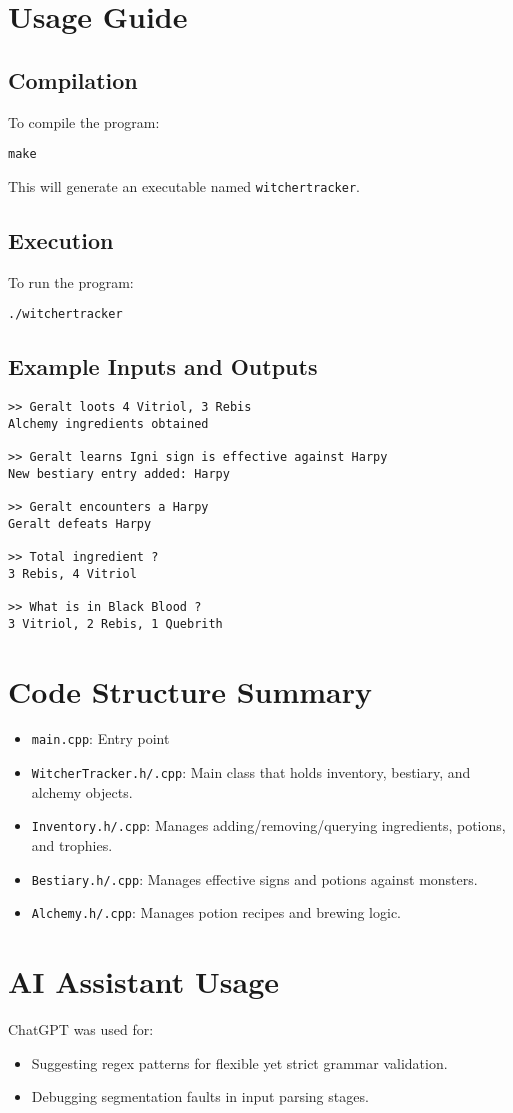\documentclass[12pt]{article}
\begin{document}
\section{Usage Guide}

\subsection{Compilation}
To compile the program:
\begin{verbatim}
make
\end{verbatim}

This will generate an executable named \texttt{witchertracker}.

\subsection{Execution}
To run the program:
\begin{verbatim}
./witchertracker
\end{verbatim}

\subsection{Example Inputs and Outputs}
\begin{verbatim}
>> Geralt loots 4 Vitriol, 3 Rebis
Alchemy ingredients obtained

>> Geralt learns Igni sign is effective against Harpy
New bestiary entry added: Harpy

>> Geralt encounters a Harpy
Geralt defeats Harpy

>> Total ingredient ?
3 Rebis, 4 Vitriol

>> What is in Black Blood ?
3 Vitriol, 2 Rebis, 1 Quebrith
\end{verbatim}

\section{Code Structure Summary}

\begin{itemize}
    \item \texttt{main.cpp}: Entry point
    \item \texttt{WitcherTracker.h/.cpp}: Main class that holds inventory, bestiary, and alchemy objects.
    \item \texttt{Inventory.h/.cpp}: Manages adding/removing/querying ingredients, potions, and trophies.
    \item \texttt{Bestiary.h/.cpp}: Manages effective signs and potions against monsters.
    \item \texttt{Alchemy.h/.cpp}: Manages potion recipes and brewing logic.
\end{itemize}

\section{AI Assistant Usage}
ChatGPT was used for:
\begin{itemize}
    \item Suggesting regex patterns for flexible yet strict grammar validation.
    \item Debugging segmentation faults in input parsing stages.
\end{itemize}
\end{document}
